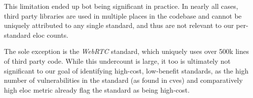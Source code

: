 This limitation ended up bot being significant in practice.  In nearly all
cases, third party libraries are used in multiple places in the \FF codebase
and cannot be uniquely attributed to any single standard, and thus are not
relevant to our per-standard \gls{eloc} counts.

The sole exception is the \textit{WebRTC} standard, which uniquely uses over
500k lines of third party code.  While this undercount is large, it too is
ultimately not significant to our goal of identifying high-cost, low-benefit
standards, as the high number of vulnerabilities in the standard  (as found in
\gls{cve}s) and comparatively high \gls{eloc} metric already flag the standard
as being high-cost.
